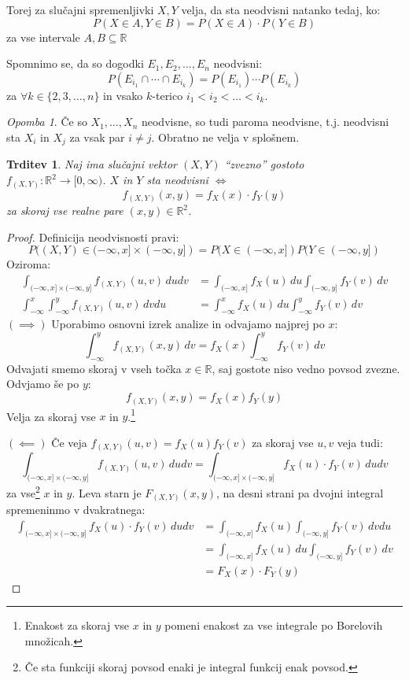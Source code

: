 \documentclass[12pt]{book}
\def\n{\noindent}
\theoremstyle{definition}
\theoremstyle{plain}
\theoremstyle{plain}
\newtheorem{trditev}{Trditev}
\theoremstyle{plain}
\theoremstyle{remark}
\newtheorem*{opomba}{Opomba}
\begin{document}
\n Torej za slučajni spremenljivki $X, Y$ velja, da sta neodvisni natanko tedaj, ko: 
$$
P(X \in A, Y \in B)=P(X \in A) \cdot P(Y \in B)
$$
za vse intervale $A,B \subseteq \mathbb{R}$

\n Spomnimo se, da so dogodki $E_1, E_2, \ldots , E_n$ neodvisni:
$$
P\left(E_{i_1} \cap \cdots \cap E_{i_k}\right)=P\left(E_{i_1}\right) \cdots P\left(E_{i_k}\right)
$$
za $\forall k \in \{2, 3, \ldots, n\}$ in vsako $k$-terico $i_1<i_2<\ldots<i_k$.

\begin{opomba}
    Če so $X_1, \ldots, X_n$ neodvisne, so tudi paroma neodvisne, t.j. neodvisni sta $X_i$ in $X_j$ za vsak par $i \neq j$. Obratno ne velja v splošnem. 
\end{opomba}

\begin{trditev}
    Naj ima slučajni vektor $(X,Y)$ “zvezno” gostoto $f_{(X,Y)}:\mathbb{R}^2 \to [0, \infty)$. $X$ in $Y$ sta neodvisni $\iff$
    $$
    f_{(X, Y)}(x, y)=f_X(x) \cdot f_Y(y)
    $$
    za skoraj vse realne pare $(x,y) \in \mathbb{R}^2$.
\end{trditev}

\begin{proof}
    Definicija neodvisnosti pravi: 
    $$
    P((X, Y) \in(-\infty, x] \times(-\infty, y])=P(X \in(-\infty, x]) P(Y \in(-\infty, y])
    $$
    Oziroma: 
    $$
    \begin{aligned}
      \int_{(-\infty, x] \times(-\infty, y]} f_{(X, Y)}(u, v) \, d u d v&=\int_{(-\infty, x]} f_X(u) \, d u \int_{(-\infty, y]} f_Y(v) \, d v  \\
      \int_{-\infty}^x \int_{-\infty}^y f_{(X, Y)}(u, v) \, d v d u&=\int_{-\infty}^x f_X(u) \, d u \int_{-\infty}^y f_Y(v) \, d v
    \end{aligned}
    $$
    $(\implies)$ Uporabimo osnovni izrek analize in odvajamo najprej po $x$:
    $$
    \int_{-\infty}^y f_{(X, Y)}(x, y) \, d v=f_X(x) \int_{-\infty}^y f_Y(v) \, d v
    $$
    Odvajati smemo skoraj v vseh točka $x \in \mathbb{R}$, saj gostote niso vedno povsod zvezne. Odvjamo še po $y$: 
    $$
    f_{(X, Y)}(x, y)=f_X(x) f_Y(y)
    $$
    Velja za skoraj vse $x$ in $y$.\footnote[3]{Enakost za skoraj vse $x$ in $y$ pomeni enakost za vse integrale po Borelovih množicah.}

    \n $(\impliedby)$ Če veja $f_{(X, Y)}(u, v)=f_X(u) f_Y(v)$ za skoraj vse $u,v$ veja tudi: 
    $$
    \int_{(-\infty, x] \times(-\infty, y]} f_{(X, Y)}(u, v) \, d u d v=\int_{(-\infty, x] \times(-\infty, y]} f_X(u) \cdot f_Y(v) \, d u d v
    $$
    za vse\footnote[4]{Če sta funkciji skoraj povsod enaki je integral funkcij enak povsod.} $x$ in $y$. Leva starn je $F_{(X,Y)}(x,y)$, na desni strani pa dvojni integral spremeninmo v dvakratnega: 
    $$
    \begin{aligned}
        \int_{(-\infty, x] \times(-\infty, y]} f_X(u) \cdot f_Y(v) \, d u d v &= \int_{(-\infty, x]} f_X(u) \int_{(-\infty, y]} f_Y(v) \, d v d u\\
        &=\int_{(-\infty, x]} f_X(u) \, d u \int_{(-\infty, y]} f_Y(v) \, d v \\
        &= F_X(x) \cdot F_Y(y)
    \end{aligned}
    $$
\end{proof}
\end{document}
